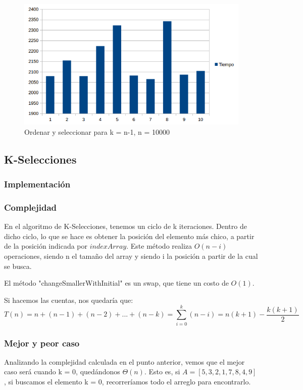 \begin{figure}[H]
\centering
\includegraphics[width=\textwidth]{KN/OrderAndSelectN.png}
\caption{Ordenar y seleccionar para k = n-1, n = 10000}
\end{figure}

\newpage
\subsection{K-Selecciones}
\subsubsection{Implementación}

\subsubsection{Complejidad}
En el algoritmo de K-Selecciones, tenemos un ciclo de k iteraciones. Dentro de dicho ciclo, lo que se hace es obtener la posición del elemento más chico, a partir de la posición indicada por $indexArray$. Este método realiza $O(n-i)$ operaciones, siendo n el tamaño del array y siendo i la posición a partir de la cual se busca.

El método "changeSmallerWithInitial" es un swap, que tiene un costo de $O(1)$.

Si hacemos las cuentas, nos quedaría que:
$$T(n) = n + (n-1) + (n-2) + ... + (n-k) = \sum_{i=0}^{k} (n - i) = n(k+1) - \frac{k (k+1)}{2}$$
\subsubsection{Mejor y peor caso}
Analizando la complejidad calculada en el punto anterior, vemos que el mejor caso será cuando k = 0, quedándonos $\Theta(n)$. Esto es, si $A = [ 5, 3, 2, 1, 7, 8, 4, 9]$, si buscamos el elemento k = 0, recorreríamos todo el arreglo para encontrarlo.

